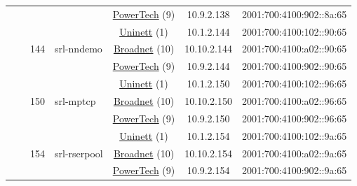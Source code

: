 \begin{small}
\begin{center}
\begin{longtable}{|c|c|c|c|c|c|c|c|}
  &  &  &  & \multicolumn{2}{|c|}{\tiny{\href{http://www.powertech.no}{PowerTech} (9)}} & \tiny{10.9.2.138} & \tiny{2001:700:4100:902::8a:65} \\* \cline{3-3}\cline{4-4}\cline{5-5}\cline{6-6}\cline{7-7}\cline{8-8}
  &  & \multirow{3}{*}{\tiny{144}} & \multicolumn{1}{|l|}{\multirow{3}{*}{\tiny{srl-nndemo}}} & \multicolumn{2}{|c|}{\tiny{\href{https://www.uninett.no}{Uninett} (1)}} & \tiny{10.1.2.144} & \tiny{2001:700:4100:102::90:65} \\* \cline{5-5}\cline{6-6}\cline{7-7}\cline{8-8}
  &  &  &  & \multicolumn{2}{|c|}{\tiny{\href{https://www.broadnet.no}{Broadnet} (10)}} & \tiny{10.10.2.144} & \tiny{2001:700:4100:a02::90:65} \\* \cline{5-5}\cline{6-6}\cline{7-7}\cline{8-8}
  &  &  &  & \multicolumn{2}{|c|}{\tiny{\href{http://www.powertech.no}{PowerTech} (9)}} & \tiny{10.9.2.144} & \tiny{2001:700:4100:902::90:65} \\* \cline{3-3}\cline{4-4}\cline{5-5}\cline{6-6}\cline{7-7}\cline{8-8}
  &  & \multirow{3}{*}{\tiny{150}} & \multicolumn{1}{|l|}{\multirow{3}{*}{\tiny{srl-mptcp}}} & \multicolumn{2}{|c|}{\tiny{\href{https://www.uninett.no}{Uninett} (1)}} & \tiny{10.1.2.150} & \tiny{2001:700:4100:102::96:65} \\* \cline{5-5}\cline{6-6}\cline{7-7}\cline{8-8}
  &  &  &  & \multicolumn{2}{|c|}{\tiny{\href{https://www.broadnet.no}{Broadnet} (10)}} & \tiny{10.10.2.150} & \tiny{2001:700:4100:a02::96:65} \\* \cline{5-5}\cline{6-6}\cline{7-7}\cline{8-8}
  &  &  &  & \multicolumn{2}{|c|}{\tiny{\href{http://www.powertech.no}{PowerTech} (9)}} & \tiny{10.9.2.150} & \tiny{2001:700:4100:902::96:65} \\* \cline{3-3}\cline{4-4}\cline{5-5}\cline{6-6}\cline{7-7}\cline{8-8}
  &  & \multirow{3}{*}{\tiny{154}} & \multicolumn{1}{|l|}{\multirow{3}{*}{\tiny{srl-rserpool}}} & \multicolumn{2}{|c|}{\tiny{\href{https://www.uninett.no}{Uninett} (1)}} & \tiny{10.1.2.154} & \tiny{2001:700:4100:102::9a:65} \\* \cline{5-5}\cline{6-6}\cline{7-7}\cline{8-8}
  &  &  &  & \multicolumn{2}{|c|}{\tiny{\href{https://www.broadnet.no}{Broadnet} (10)}} & \tiny{10.10.2.154} & \tiny{2001:700:4100:a02::9a:65} \\* \cline{5-5}\cline{6-6}\cline{7-7}\cline{8-8}
  &  &  &  & \multicolumn{2}{|c|}{\tiny{\href{http://www.powertech.no}{PowerTech} (9)}} & \tiny{10.9.2.154} & \tiny{2001:700:4100:902::9a:65} \\* \cline{3-3}\cline{4-4}\cline{5-5}\cline{6-6}\cline{7-7}\cline{8-8}

\end{longtable}
\end{center}
\end{small}
